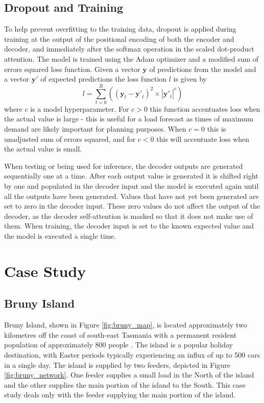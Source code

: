 \documentclass[conference]{IEEEtran}
\begin{document}
\subsection{Dropout and Training}
To help prevent overfitting to the training data, dropout \cite{srivastava14a} is applied during training at the output of the positional encoding of both the encoder and decoder, and immediately after the softmax operation in the scaled dot-product attention.
The model is trained using the Adam optimizer \cite{Kingma2014} and a modified sum of errors squared loss function.
Given a vector $\boldsymbol{y}$ of predictions from the model and a vector $\boldsymbol{y'}$ of expected predictions the loss function $l$ is given by 
\begin{equation}
l = \sum_{t=0}^{R}((\boldsymbol{y}_t - \boldsymbol{y'}_t)^2 \times |\boldsymbol{y'}_t|^c)
\end{equation}
where $c$ is a model hyperparameter.
For $c>0$ this function accentuates loss when the actual value is large - this is useful for a load forecast as times of maximum demand are likely important for planning purposes.
When $c=0$ this is unadjusted sum of errors squared, and for $c<0$ this will accentuate loss when the actual value is small.

When testing or being used for inference, the decoder outputs are generated sequentially one at a time.
After each output value is generated it is shifted right by one and populated in the decoder input and the model is executed again until all the outputs have been generated.
Values that have not yet been generated are set to zero in the decoder input.
These zero values do not affect the output of the decoder, as the decoder self-attention is masked so that it does not make use of them.
When training, the decoder input is set to the known expected value and the model is executed a single time.


\section{Case Study}

\subsection{Bruny Island}
Bruny Island, shown in Figure \ref{fig:bruny_map}, is located approximately two kilometres off the coast of south-east Tasmania with a permanent resident population of approximately 800 people \cite{census2016}.
The island is a popular holiday destination, with Easter periods typically experiencing an influx of up to 500 cars in a single day.
The island is supplied by two feeders, depicted in Figure \ref{fig:bruny_network}.
One feeder supplies a small load in the North of the island and the other supplies the main portion of the island to the South.
This case study deals only with the feeder supplying the main portion of the island.
\end{document}
